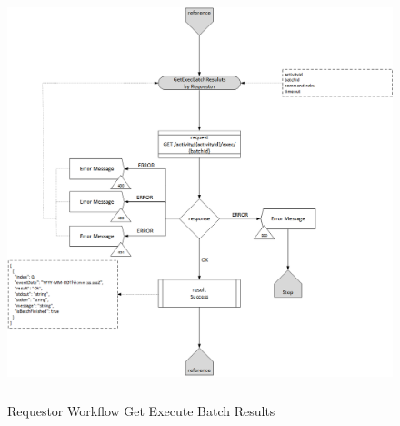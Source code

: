 \begin{enumerate}
\begin{figure}[H]
    \centering
    \includegraphics[width=12cm,height=12cm,angle=0]{./diag/Workflow/Activity/GetExecBatchResults-R-Workflow.png}
    \caption{Requestor Workflow Get Execute Batch Results}
	\label{fig:RGEBR}
\end{figure}


\end{enumerate}

\newpage



